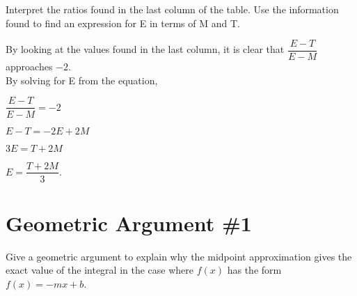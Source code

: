 \documentclass[letterpaper,12pt]{article}
\begin{document}
\begin{large}

Interpret the ratios found in the last column of the table. Use the information found to find an expression for E in terms of M and T.

\end{large}

\vspace{1cm}

By looking at the values found in the last column, it is clear that $\dfrac{E-T}{E-M}$ approaches $-2$.\\
By solving for E from the equation,

\vspace{0.7cm}
\centerline{$\dfrac{E-T}{E-M}=-2$}
\vspace{0.7cm}
\centerline{$E-T=-2E+2M$}
\vspace{0.7cm}
\centerline{$3E=T+2M$}
\vspace{0.7cm}
\centerline{$E=\dfrac{T+2M}{3}$.}

\section{Geometric Argument \#1}

\begin{large}

Give a geometric argument to explain why the midpoint approximation gives the exact value of the integral in the case where $f(x)$ has the form $f(x)=-mx+b$.

\vspace{1cm}



\end{large}
\end{document}
